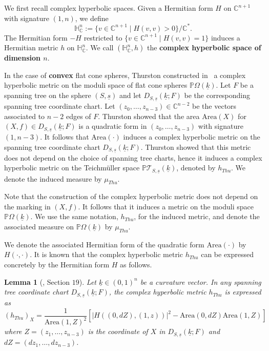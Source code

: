 \documentclass{compositio}
\numberwithin{equation}{section}
\numberwithin{figure}{section}
\theoremstyle{definition}
\theoremstyle{plain}
\newtheorem{lemma}[definition]{Lemma}
\begin{document}
{We first recall complex hyperbolic spaces. Given a Hermitian form $H$ on $\mathbb{C}^{n+1}$ with signature $(1, n)$, we define
$$
\mathbb{H}_{\mathbb{C}}^n := \{v \in \mathbb{C}^{n+1} \mid H(v,v) > 0\}/\mathbb{C}^{\ast}.
$$
The Hermitian form $-H$ restricted to $\{v \in \mathbb{C}^{n+1} \mid H(v,v) = 1\}$ induces a Hermitian metric $h$ on $\mathbb{H}_{\mathbb{C}}^n$. We call $(\mathbb{H}_{\mathbb{C}}^n, h)$ the \textbf{complex hyperbolic space of dimension $n$}.

In the case of \textbf{convex} flat cone spheres, Thurston constructed in~\cite{thu} a complex hyperbolic metric on the moduli space of flat cone spheres $\mathbb{P}\Omega(\underline{k})$. Let $F$ be a spanning tree on the sphere $(S, \underline{s})$ and let $D_{S,\underline{s}}(\underline{k};F)$ be the corresponding spanning tree coordinate chart. Let $(z_0,\ldots,z_{n-3})\in \mathbb{C}^{n-2}$ be the vectors associated to  $n-2$ edges of $F$. Thurston showed that the area $\mathrm{Area}(X)$ for $(X, f)\in D_{S,\underline{s}}(\underline{k};F)$ is a quadratic form in $(z_0,\ldots,z_{n-3})$ with signature $(1, n-3)$. It follows that $\mathrm{Area}(\cdot)$ induces a complex hyperbolic metric on the spanning tree coordinate chart $D_{S,\underline{s}}(\underline{k};F)$. Thurston showed that this metric does not depend on the choice of spanning tree charts, hence it induces a complex hyperbolic metric on the Teichm\"uller space $\mathbb{P}\mathcal{T}_{S, \underline{s}}(\underline{k})$, denoted by $h_{Thu}$. We denote the induced measure by $\mu_{Thu}$.

Note that the construction of the complex hyperbolic metric does not depend on the marking in $(X, f)$. It follows that it induces a metric on the moduli space $\mathbb{P}\Omega(\underline{k})$. We use the same notation, $h_{Thu}$, for the induced metric, and denote the associated measure on $\mathbb{P}\Omega(\underline{k})$ by $\mu_{Thu}$.

We denote the associated Hermitian form of the quadratic form $\mathrm{Area}(\cdot)$ by $H(\cdot,\cdot)$. It is known that the complex hyperbolic metric $h_{Thu}$ can be expressed concretely by the Hermitian form $H$ as follows.

\begin{lemma}[\cite{Mos}, Section $19$]\label{lem:metricformula}
    Let $\underline{k}\in (0,1)^n$ be a curvature vector.
    In any spanning tree coordinate chart $D_{S,\underline{s}}(\underline{k};F)$, the complex hyperbolic metric $h_{Thu}$ is expressed as
    $$(h_{Thu})_{X}=\frac{1}{\mathrm{Area}(1,Z)^2}\left[|H((0,dZ),(1,z))|^2-\mathrm{Area}(0,dZ)\mathrm{Area}(1,Z)\right]$$
    where $Z = (z_1, \ldots,z_{n-3})$ is the coordinate of $X$ in $D_{S,\underline{s}}(\underline{k};F)$ and $dZ=(dz_1,\ldots,dz_{n-3})$.
\end{lemma}

}
\end{document}
